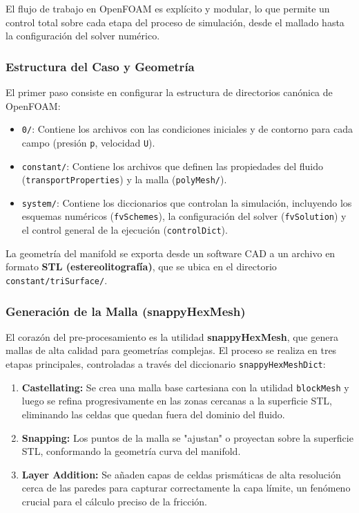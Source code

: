 \documentclass[11pt, a4paper,oneside]{article}
\begin{document}
El flujo de trabajo en OpenFOAM es explícito y modular, lo que permite un control total sobre cada etapa del proceso de simulación, desde el mallado hasta la configuración del solver numérico.

\subsubsection{Estructura del Caso y Geometría}
El primer paso consiste en configurar la estructura de directorios canónica de OpenFOAM:
\begin{itemize}
    \itemsep0em
    \item \texttt{0/}: Contiene los archivos con las condiciones iniciales y de contorno para cada campo (presión \texttt{p}, velocidad \texttt{U}).
    \item \texttt{constant/}: Contiene los archivos que definen las propiedades del fluido (\texttt{transportProperties}) y la malla (\texttt{polyMesh/}).
    \item \texttt{system/}: Contiene los diccionarios que controlan la simulación, incluyendo los esquemas numéricos (\texttt{fvSchemes}), la configuración del solver (\texttt{fvSolution}) y el control general de la ejecución (\texttt{controlDict}).
\end{itemize}
La geometría del manifold se exporta desde un software CAD a un archivo en formato \textbf{STL (estereolitografía)}, que se ubica en el directorio \texttt{constant/triSurface/}.

\subsubsection{Generación de la Malla (snappyHexMesh)}
El corazón del pre-procesamiento es la utilidad \textbf{snappyHexMesh}, que genera mallas de alta calidad para geometrías complejas. El proceso se realiza en tres etapas principales, controladas a través del diccionario \texttt{snappyHexMeshDict}:
\begin{enumerate}
    \item \textbf{Castellating:} Se crea una malla base cartesiana con la utilidad \texttt{blockMesh} y luego se refina progresivamente en las zonas cercanas a la superficie STL, eliminando las celdas que quedan fuera del dominio del fluido.
    \item \textbf{Snapping:} Los puntos de la malla se "ajustan" o proyectan sobre la superficie STL, conformando la geometría curva del manifold.
    \item \textbf{Layer Addition:} Se añaden capas de celdas prismáticas de alta resolución cerca de las paredes para capturar correctamente la capa límite, un fenómeno crucial para el cálculo preciso de la fricción.
\end{enumerate}
\end{document}
